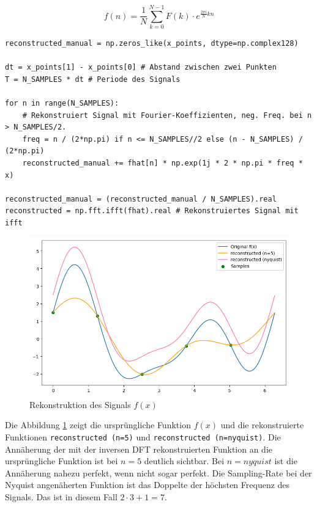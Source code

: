 \documentclass[11pt,a4paper]{article}
\begin{document}
\[
	f(n) = \frac{1}{N} \sum_{k=0}^{N-1} F(k) \cdot e^{\frac{2\pi i}{N} kn}
\]

\begin{lstlisting}
reconstructed_manual = np.zeros_like(x_points, dtype=np.complex128)

dt = x_points[1] - x_points[0] # Abstand zwischen zwei Punkten
T = N_SAMPLES * dt # Periode des Signals

for n in range(N_SAMPLES):
    # Rekonstruiert Signal mit Fourier-Koeffizienten, neg. Freq. bei n > N_SAMPLES/2.
    freq = n / (2*np.pi) if n <= N_SAMPLES//2 else (n - N_SAMPLES) / (2*np.pi)
    reconstructed_manual += fhat[n] * np.exp(1j * 2 * np.pi * freq * x)

reconstructed_manual = (reconstructed_manual / N_SAMPLES).real
reconstructed = np.fft.ifft(fhat).real # Rekonstruiertes Signal mit ifft
\end{lstlisting}

\begin{figure}[h]
	\centering
	\includegraphics[width=0.60\linewidth]{img/dft_reconstructed.png}
	\caption{Rekonstruktion des Signals \(f(x)\)}
	\label{fig:dft_example_reconstructed}
\end{figure}

\noindent
\newline
Die Abbildung \ref{fig:dft_example_reconstructed} zeigt die ursprüngliche Funktion \(f(x)\) und die
rekonstruierte Funktionen \texttt{reconstructed (n=5)} und \texttt{reconstructed (n=nyquist)}.
Die Annäherung der mit der inversen DFT rekonstruierten Funktion an die ursprüngliche Funktion ist
bei \(n=5\) deutlich sichtbar. Bei \(n=nyquist\) ist die Annäherung nahezu perfekt, wenn nicht sogar
perfekt. Die Sampling-Rate bei der Nyquist angenäherten Funktion ist das Doppelte der höchsten
Frequenz des Signals. Das ist in diesem Fall \(2 \cdot 3 + 1 = 7\).
\end{document}
